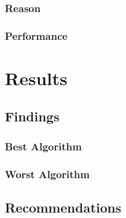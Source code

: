 \documentclass[12pt]{article}
\begin{document}
	\subsubsection{Reason}
	\subsubsection{Performance}
	\newpage
	
	
	\section{Results}
	\subsection{Findings}
	\subsubsection{Best Algorithm}
	\subsubsection{Worst Algorithm}
	\subsection{Recommendations}
	\newpage
	
\end{document}
